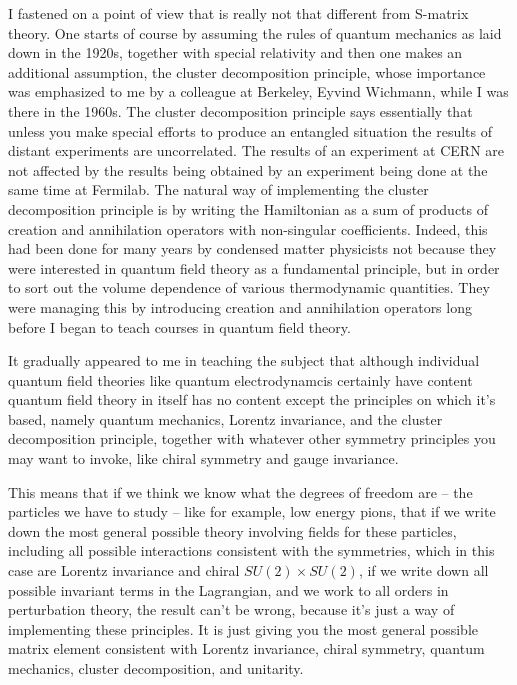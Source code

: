 \documentclass[12pt]{article}
\begin{document}
I fastened on a point of view that is really not that different from S-matrix theory. One starts  of course by assuming the rules of quantum mechanics as laid down in the 1920s, together with special relativity and then one makes an additional assumption,  the cluster decomposition principle, whose importance was emphasized to me by a colleague at Berkeley, Eyvind Wichmann, while I was there in the 1960s. The cluster decomposition principle says essentially that unless you make special efforts to produce an entangled situation the results of distant experiments are uncorrelated. The results of an experiment at CERN are not affected by the results being obtained by an experiment being done at the same time at Fermilab.  
The natural way of implementing the cluster decomposition principle is by writing the Hamiltonian as a sum of products of creation and annihilation operators with non-singular coefficients. Indeed, this had been done for many years by condensed matter physicists not because they were interested in quantum field theory as a fundamental principle, but in order to sort out the volume dependence of various thermodynamic quantities.  They were managing this  by introducing creation and annihilation operators long before I began to teach courses in quantum field theory. 

It gradually appeared to me in teaching the subject that although individual quantum field theories like quantum electrodynamcis certainly have content  quantum field theory in itself has no content except the principles on which it's based, namely quantum mechanics, Lorentz invariance, and the cluster decomposition principle, together with whatever other symmetry principles you may want to invoke, like chiral symmetry and gauge invariance.

This means that if we think we know what the degrees of freedom are -- the particles we have to study -- like for example, low energy pions, that if we write down the most general possible theory involving fields for these particles, including all possible interactions consistent with the symmetries, which  in this case are Lorentz invariance and  chiral $SU(2)\times SU(2)$, if we write down all possible invariant terms in the Lagrangian, and we work to all orders in perturbation theory, the result can't be wrong, because it's just a way of implementing these principles. It is just giving you the most general possible matrix element consistent with Lorentz invariance, chiral symmetry, quantum mechanics, cluster decomposition, and  unitarity.
\end{document}
